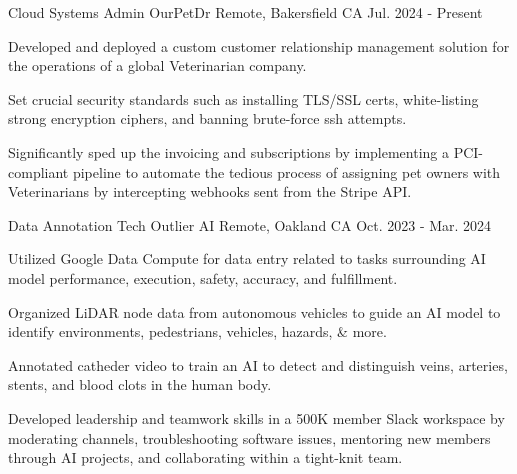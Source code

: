 
\begin{cventries}

  \cventry
    {Cloud Systems Admin} %
    {OurPetDr} %
    {Remote, Bakersfield CA} %
    {Jul. 2024 - Present} %
    {
      \begin{cvitems} %
		  \item {Developed and deployed a custom customer relationship management solution for the operations of a global Veterinarian company.}
		  \item {Set crucial security standards such as installing TLS/SSL certs, white-listing strong encryption ciphers, and banning brute-force ssh attempts.}
		  \item {Significantly sped up the invoicing and subscriptions by implementing a PCI-compliant pipeline to automate the tedious process of assigning pet owners with Veterinarians by intercepting webhooks sent from the Stripe API.}
      \end{cvitems}
    }

  \cventry
    {Data Annotation Tech} %
    {Outlier AI} %
    {Remote, Oakland CA} %
    {Oct. 2023 - Mar. 2024} %
    {
      \begin{cvitems} %
		  \item {Utilized Google Data Compute for data entry related to tasks surrounding AI model performance, execution, safety, accuracy, and fulfillment.}
		  \item {Organized LiDAR node data from autonomous vehicles to guide an AI model to identify environments, pedestrians, vehicles, hazards, \& more.}
		  \item {Annotated catheder video to train an AI to detect and distinguish veins, arteries, stents, and blood clots in the human body.}
		  \item {Developed leadership and teamwork skills in a 500K member Slack workspace by moderating channels, troubleshooting software issues, mentoring new members through AI projects, and collaborating within a tight-knit team.}
      \end{cvitems}
    }


\end{cventries}

